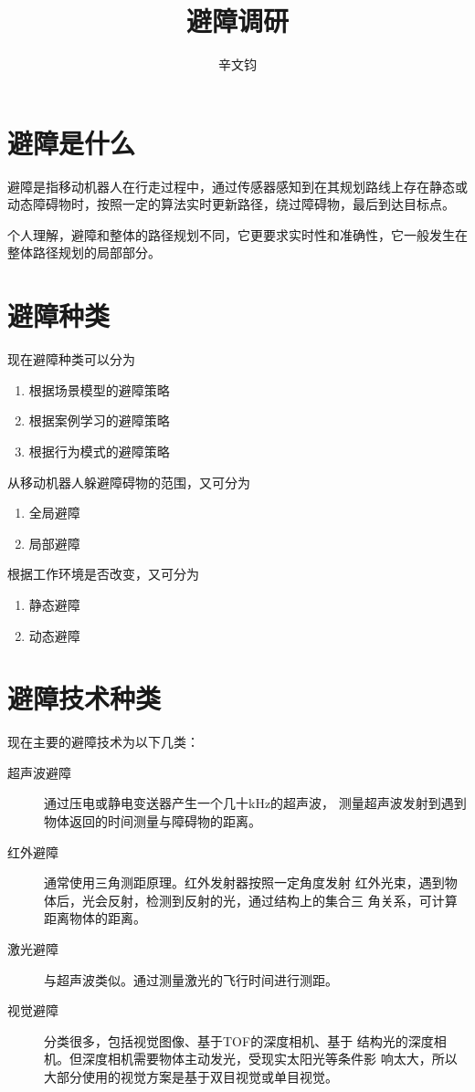 \documentclass[a4paper]{article}
\title{避障调研}
\date{}
\author{辛文钧}
\begin{document}
	\maketitle
	\section{避障是什么}
	避障是指移动机器人在行走过程中，通过传感器感知到在其规划路线上存在静态或动态障碍物时，按照一定的算法实时更新路径，绕过障碍物，最后到达目标点。
	
	个人理解，避障和整体的路径规划不同，它更要求实时性和准确性，它一般发生在整体路径规划的局部部分。
	
	\section{避障种类}
	现在避障种类可以分为
	\begin{enumerate}
		\item 根据场景模型的避障策略
		\item 根据案例学习的避障策略
		\item 根据行为模式的避障策略
	\end{enumerate}
	从移动机器人躲避障碍物的范围，又可分为
	\begin{enumerate}
		\item 全局避障
		\item 局部避障
	\end{enumerate}
	根据工作环境是否改变，又可分为
	\begin{enumerate}
		\item 静态避障
		\item 动态避障
	\end{enumerate}
	
	\section{避障技术种类}
	现在主要的避障技术为以下几类：
	\begin{description}
		\item[超声波避障] 通过压电或静电变送器产生一个几十kHz的超声波，
		测量超声波发射到遇到物体返回的时间测量与障碍物的距离。
		\item[红外避障] 通常使用三角测距原理。红外发射器按照一定角度发射
		红外光束，遇到物体后，光会反射，检测到反射的光，通过结构上的集合三
		角关系，可计算距离物体的距离。
		\item[激光避障] 与超声波类似。通过测量激光的飞行时间进行测距。
		\item[视觉避障] 分类很多，包括视觉图像、基于TOF的深度相机、基于
		结构光的深度相机。但深度相机需要物体主动发光，受现实太阳光等条件影
		响太大，所以大部分使用的视觉方案是基于双目视觉或单目视觉。
	\end{description}
	
\end{document}
